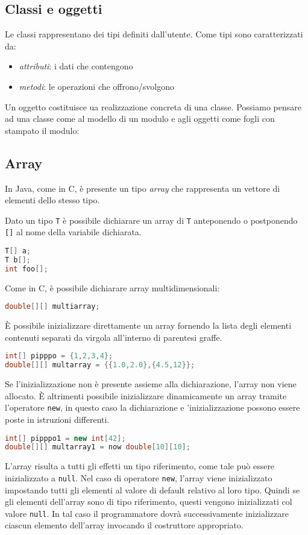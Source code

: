 \documentclass{article}
\begin{document}
\subsection{Classi e oggetti}

Le classi rappresentano dei tipi definiti dall'utente.
Come tipi sono caratterizzati da:
\begin{itemize}
	\item \emph{attributi}: i dati che contengono
	\item \emph{metodi}: le operazioni che offrono/svolgono
\end{itemize}

Un oggetto costituisce ua realizzazione concreta di una classe.
Possiamo pensare ad una classe come al modello di
un modulo e agli oggetti come fogli con stampato il modulo:


\subsection{Array}

In Java, come in C, è presente un tipo \emph{array} che rappresenta
un vettore di elementi dello stesso tipo.

Dato un tipo \texttt{T} è possibile dichiarare un array di \texttt{T}
anteponendo o postponendo \texttt{[]} al nome della variabile
dichiarata.
\begin{lstlisting}[language=Java,escapechar=|]
T[] a;
T b[];
int foo[];
\end{lstlisting}
Come in C, è possibile dichiarare array multidimensionali:
\begin{lstlisting}[language=Java,escapechar=|]
double[][] multiarray;
\end{lstlisting}
È possibile inizializzare direttamente un array fornendo
la lista degli elementi contenuti separati da virgola
all'interno di parentesi graffe.
\begin{lstlisting}[language=Java,escapechar=|]
int[] pipppo = {1,2,3,4};
double[][] multarray = {{1.0,2.0},{4.5,12}};
\end{lstlisting} 
Se l'inizializzazione non è presente assieme alla dichiarazione,
l'array non viene allocato.
È altrimenti possibile inizializzare dinamicamente un array tramite 
l'operatore \texttt{new},
in questo caso la dichiarazione e 'inizializzazione possono essere
poste in istruzioni differenti.
\begin{lstlisting}[language=Java,escapechar=|]
int[] pipppo1 = new int[42];
double[][] multarray1 = now double[10][10];
\end{lstlisting} 
L'array risulta a tutti gli effetti un tipo riferimento, come
tale può essere inizializzato a \texttt{null}.
Nel caso di operatore \texttt{new}, l'array viene inizializzato 
impostando tutti gli elementi al valore di default relativo al
loro tipo.
Quindi se gli elementi dell'array sono di tipo riferimento, 
questi vengono inizializzati col valore \texttt{null}.
In tal caso il programmatore dovrà successivamente
inizializzare ciascun elemento dell'array invocando 
il costruttore appropriato.
\end{document}

